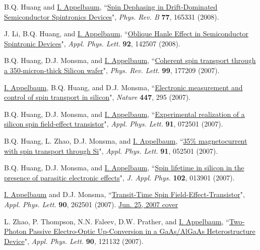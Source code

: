 \documentclass[paper=letter,fontsize=11pt]{scrartcl} %
\newcommand{\PaperEntry}[7]{
		\noindent #1, ``\href{#7}{#2}", \textit{#3} \textbf{#4}, #5 (#6).}
\begin{document}
\begin{etaremune}
\item\PaperEntry{B.Q. Huang and \underline{I. Appelbaum}}{Spin Dephasing in Drift-Dominated Semiconductor Spintronics Devices}{Phys. Rev. B}{77}{165331}{2008}{http://dx.doi.org/10.1103/PhysRevB.77.165331}

\item\PaperEntry{J. Li, B.Q. Huang, and \underline{I. Appelbaum}}{Oblique Hanle Effect in Semiconductor Spintronic Devices}{Appl. Phys. Lett.}{92}{142507}{2008}{http://dx.doi.org/10.1063/1.2907497}

\item\PaperEntry{B.Q. Huang, D.J. Monsma, and \underline{I. Appelbaum}}{Coherent spin transport through a 350-micron-thick Silicon wafer}{Phys. Rev. Lett.}{99}{177209}{2007}{http://dx.doi.org/10.1103/PhysRevLett.99.177209}

\item\PaperEntry{\underline{I. Appelbaum}, B.Q. Huang, and D.J. Monsma}{Electronic measurement and control of spin transport in silicon}{Nature}{447}{295}{2007}{http://dx.doi.org/10.1038/nature05803}

\item\PaperEntry{B.Q. Huang, D.J. Monsma, and \underline{I. Appelbaum}}{Experimental realization of a silicon spin field-effect transistor}{Appl. Phys. Lett.}{91}{072501}{2007}{http://dx.doi.org/10.1063/1.2770656}

\item\PaperEntry{B.Q. Huang, L. Zhao, D.J. Monsma, and \underline{I. Appelbaum}}{35\% magnetocurrent with spin transport through Si}{Appl. Phys. Lett.}{91}{052501}{2007}{http://dx.doi.org/10.1063/1.2767198}

\item\PaperEntry{B.Q. Huang, D.J. Monsma, and \underline{I. Appelbaum}}{Spin lifetime in silicon in the presence of parasitic electronic effects}{J. Appl. Phys.}{102}{013901}{2007}{http://dx.doi.org/10.1063/1.2750411}

\item\PaperEntry{\underline{I. Appelbaum} and D.J. Monsma}{Transit-Time Spin Field-Effect-Transistor}{Appl. Phys. Lett.}{90}{262501}{2007}{http://dx.doi.org/10.1063/1.2752015} \href{http://scitation.aip.org/apl/covers/90_26.jsp}{Jun. 25, 2007 cover}

\item\PaperEntry{L. Zhao, P. Thompson, N.N. Faleev, D.W. Prather, and \underline{I. Appelbaum}}{Two-Photon Passive Electro-Optic Up-Conversion in a GaAs/AlGaAs Heterostructure Device}{Appl. Phys. Lett.}{90}{121132}{2007}{http://dx.doi.org/10.1063/1.2716354}


\end{etaremune}
\end{document}
